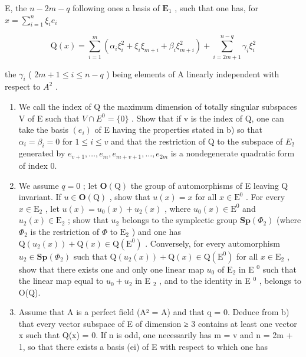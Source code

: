 E, the \(n - 2m - q\) following ones a basis of \(\mathbf{E}_1\) , such that one has, for \(x = \sum_{i=1}^{n} \xi_i e_i\)

\[
\mathrm{Q} (x) = \sum_ {i = 1} ^ {m} \left(\alpha_ {i} \xi_ {i} ^ {2} + \xi_ {i} \xi_ {m + i} + \beta_ {i} \xi_ {m + i} ^ {2}\right) + \sum_ {i = 2 m + 1} ^ {n - q} \gamma_ {i} \xi_ {i} ^ {2}
\]

the \(\gamma_{i}\) ( \(2m + 1 \leqslant i \leqslant n - q\) ) being elements of A linearly independent with respect to \(A^{2}\) .

\begin{enumerate}
\def\labelenumi{\alph{enumi})}
\setcounter{enumi}{2}
\item
  We call the index of Q the maximum dimension of totally singular subspaces V of E such that \(V \cap E^{0} = \{0\}\) . Show that if v is the index of Q, one can take the basis \((e_{i})\) of E having the properties stated in b) so that \(\alpha_{i} = \beta_{i} = 0\) for \(1 \leqslant i \leqslant v\) and that the restriction of Q to the subspace of \(E_{2}\) generated by \(e_{v+1}, \ldots, e_{m}, e_{m+v+1}, \ldots, e_{2m}\) is a nondegenerate quadratic form of index 0.
\item
  We assume \(q=0\) ; let \(\mathbf{O}(\mathrm{Q})\) the group of automorphisms of E leaving Q invariant. If \(u\in\mathbf{O}(\mathrm{Q})\) , show that \(u(x)=x\) for all \(x\in\mathrm{E}^{0}\) . For every \(x\in\mathrm{E}_{2}\) , let \(u(x)=u_{0}(x)+u_{2}(x)\) , where \(u_{0}(x)\in\mathrm{E}^{0}\) and \(u_{2}(x)\in\mathrm{E}_{2}\) ; show that \(u_{2}\) belongs to the symplectic group \(\mathbf{Sp}(\Phi_{2})\) (where \(\Phi_{2}\) is the restriction of \(\Phi\) to \(\mathrm{E}_{2}\) ) and one has \(\mathrm{Q}(u_{2}(x))+\mathrm{Q}(x)\in\mathrm{Q}(\mathrm{E}^{0})\) . Conversely, for every automorphism \(u_{2}\in\mathbf{Sp}(\Phi_{2})\) such that \(\mathrm{Q}(u_{2}(x))+\mathrm{Q}(x)\in\mathrm{Q}(\mathrm{E}^{0})\) for all \(x\in\mathrm{E}_{2}\) , show that there exists one and only one linear map \(u_{0}\) of \(\mathrm{E}_{2}\) in E \(^{0}\) such that the linear map equal to \(u_{0} + u_{2}\) in E \(_{2}\) , and to the identity in E \(^{0}\) , belongs to O(Q).
\item
  Assume that A is a perfect field (A² = A) and that q = 0. Deduce from b) that every vector subspace of E of dimension ≥ 3 contains at least one vector x such that Q(x) = 0. If n is odd, one necessarily has m = v and n = 2m + 1, so that there exists a basis (ei) of E with respect to which one has
\end{enumerate}

